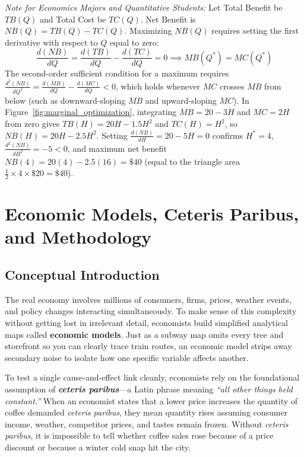 \documentclass[11pt,letterpaper]{article}
\begin{document}
\begin{tcolorbox}[colback=blue!5!white,colframe=blue!75!black,title=\textbf{Optional Advanced Section: Calculus of Net Benefit Maximization}]
\small
\emph{Note for Economics Majors and Quantitative Students:}
Let Total Benefit be $TB(Q)$ and Total Cost be $TC(Q)$. Net Benefit is $NB(Q) = TB(Q) - TC(Q)$. Maximizing $NB(Q)$ requires setting the first derivative with respect to $Q$ equal to zero:
\[
\frac{d(NB)}{dQ} = \frac{d(TB)}{dQ} - \frac{d(TC)}{dQ} = 0 \implies MB(Q^*) = MC(Q^*)
\]
The second-order sufficient condition for a maximum requires $\frac{d^2(NB)}{dQ^2} = \frac{d(MB)}{dQ} - \frac{d(MC)}{dQ} < 0$, which holds whenever $MC$ crosses $MB$ from below (such as downward-sloping $MB$ and upward-sloping $MC$). In Figure~\ref{fig:marginal_optimization}, integrating $MB = 20 - 3H$ and $MC = 2H$ from zero gives $TB(H) = 20H - 1.5H^2$ and $TC(H) = H^2$, so $NB(H) = 20H - 2.5H^2$. Setting $\frac{d(NB)}{dH} = 20 - 5H = 0$ confirms $H^* = 4$, $\frac{d^2(NB)}{dH^2} = -5 < 0$, and maximum net benefit $NB(4) = 20(4) - 2.5(16) = \$40$ (equal to the triangle area $\frac{1}{2} \times 4 \times \$20 = \$40$).
\end{tcolorbox}

\section{Economic Models, Ceteris Paribus, and Methodology}

\subsection*{Conceptual Introduction}
The real economy involves millions of consumers, firms, prices, weather events, and policy changes interacting simultaneously. To make sense of this complexity without getting lost in irrelevant detail, economists build simplified analytical maps called \textbf{economic models}. Just as a subway map omits every tree and storefront so you can clearly trace train routes, an economic model strips away secondary noise to isolate how one specific variable affects another.

To test a single cause-and-effect link cleanly, economists rely on the foundational assumption of \textbf{\textit{ceteris paribus}}—a Latin phrase meaning \emph{``all other things held constant.''} When an economist states that a lower price increases the quantity of coffee demanded \emph{ceteris paribus}, they mean quantity rises assuming consumer income, weather, competitor prices, and tastes remain frozen. Without \emph{ceteris paribus}, it is impossible to tell whether coffee sales rose because of a price discount or because a winter cold snap hit the city.
\end{document}
